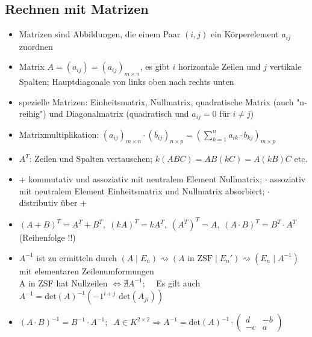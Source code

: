 \documentclass[10pt,a4paper]{article}
\begin{document}
\subsection{Rechnen mit Matrizen}
\begin{itemize}
\item Matrizen sind Abbildungen, die einem Paar $(i,j)$ ein Körperelement $a_{ij}$ zuordnen 
\item Matrix $A=(a_{ij})=(a_{ij})_{m \times n}$, es gibt $i$ horizontale Zeilen und $j$ vertikale Spalten; Hauptdiagonale von links oben nach rechts unten
\item spezielle Matrizen: Einheitsmatrix, Nullmatrix, quadratische Matrix (auch "n-reihig") und Diagonalmatrix (quadratisch und $a_{ij}=0$ für $i\neq j$)
\item Matrixmultiplikation: $(a_{ij})_{m\times n} \cdot (b_{ij})_{n \times p}=(\sum_{k=1}^{n} a_{ik}\cdot b_{kj})_{m \times p}$ 
\item $A^{T}$: Zeilen und Spalten vertauschen; $k(ABC)=AB(kC)=A(kB)C$ etc.
\item + kommutativ und assoziativ mit neutralem Element Nullmatrix; $\cdot$ assoziativ mit neutralem Element Einheitsmatrix und Nullmatrix absorbiert; $\cdot$ distributiv über + 
\item $(A+B)^{T}=A^{T}+B^{T},\; (kA)^{T}=kA^{T},\; (A^{T})^{T}=A,\; (A\cdot B)^{T}=B^{T}\cdot A^{T}$ (Reihenfolge !!)
\item $A^{-1}$ ist zu ermitteln durch $(A\mid E_{n})\rightsquigarrow (A \text{ in ZSF} \mid E_{n}') \rightsquigarrow (E_{n} \mid A^{-1})$ mit elementaren Zeilenumformungen\\ A in ZSF hat Nullzeilen $\Leftrightarrow \nexists A^{-1};\;\;\;$ Es gilt auch $A^{-1}=\text{det}(A)^{-1}(-1^{i+j}\text{ det}(A_{ji}))$
\item $(A\cdot B)^{-1}=B^{-1}\cdot A^{-1};\;\;A\in K^{2\times 2} \Rightarrow A^{-1}=\text{det}(A)^{-1}\cdot \begin{pmatrix} d& -b\\ -c&a\end{pmatrix}$
\end{itemize}
\end{document}
